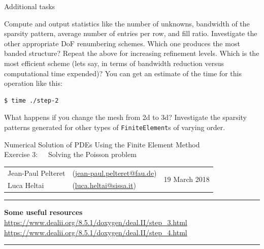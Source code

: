 \documentclass[11pt]{exam}
\makeatletter
\newcommand{\makeheader}[3]{%
\setcounter{question}{0}
\begin{center}
{\sc Numerical Solution of PDEs Using the Finite Element Method}\vspace{2ex}\\
{\sc Exercise #1:\ \ \ #2}\vspace{2ex}\\
\begin{tabular*}{\textwidth}{ll @{\extracolsep{\fill}}r}
Jean-Paul Pelteret & (\url{jean-paul.pelteret@fau.de}) & \multirow{2}{*}{#3} \\
Luca Heltai & (\url{luca.heltai@sissa.it}) & \\
\end{tabular*}
\end{center}
}
\newcommand{\makeresources}[1]{%
\rule{\textwidth}{0.6mm}
\textbf{Some useful resources}\\[1.5ex]
#1 \par
\rule{\textwidth}{0.6mm}
}
\makeatother
\begin{document}
\begin{questions}

\question Additional tasks
\begin{parts}
\bonuspart Compute and output statistics like the number of unknowns, bandwidth of the sparsity pattern, average number of entries per row, and fill ratio.
\bonuspart Investigate the other appropriate DoF renumbering schemes. Which one produces the most banded structure?
\bonuspart Repeat the above for increasing refinement levels. Which is the most efficient scheme (lets say, in terms of bandwidth reduction versus computational time expended)?  You can get an estimate of the time for this operation like this:
\begin{lstlisting}[language=bash]
$ time ./step-2
\end{lstlisting}
\bonuspart What happens if you change the mesh from 2d to 3d?
\bonuspart Investigate the sparsity patterns generated for other types of \verb|FiniteElement|s of varying order.
\end{parts}

\end{questions}




\clearpage
\makeheader{3}{Solving the Poisson problem}{19 March 2018}
\makeresources{%
\url{https://www.dealii.org/8.5.1/doxygen/deal.II/step_3.html} \\
\url{https://www.dealii.org/8.5.1/doxygen/deal.II/step_4.html}
}
\end{document}
